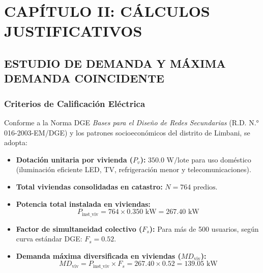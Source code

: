 \chapter*{CAPÍTULO II: CÁLCULOS JUSTIFICATIVOS}

\section{ESTUDIO DE DEMANDA Y MÁXIMA DEMANDA COINCIDENTE}

\subsection{Criterios de Calificación Eléctrica}
Conforme a la Norma DGE \textit{Bases para el Diseño de Redes Secundarias} (R.D. N.° 016-2003-EM/DGE) y los patrones socioeconómicos del distrito de Limbani, se adopta:
\begin{itemize}
  \item \textbf{Dotación unitaria por vivienda ($P_v$):} $350.0\text{ W/lote}$ para uso doméstico (iluminación eficiente LED, TV, refrigeración menor y telecomunicaciones).
  \item \textbf{Total viviendas consolidadas en catastro:} $N = 764\text{ predios}$.
  \item \textbf{Potencia total instalada en viviendas:}
    $$P_{\text{inst\_viv}} = 764 \times 0.350\text{ kW} = 267.40\text{ kW}$$
  \item \textbf{Factor de simultaneidad colectivo ($F_s$):} Para más de 500 usuarios, según curva estándar DGE: $F_s = 0.52$.
  \item \textbf{Demanda máxima diversificada en viviendas ($MD_{\text{viv}}$):}
    $$MD_{\text{viv}} = P_{\text{inst\_viv}} \times F_s = 267.40 \times 0.52 = 139.05\text{ kW}$$
\end{itemize}

